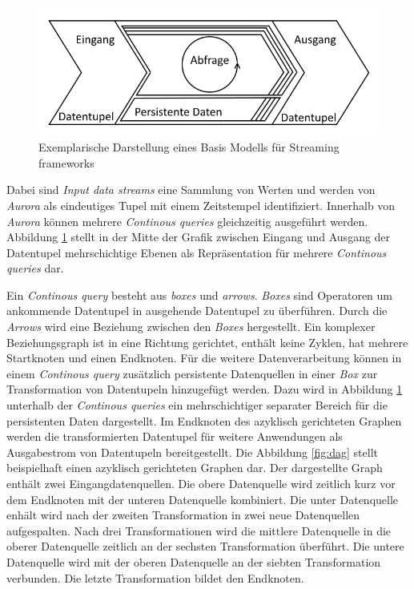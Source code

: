 \begin{figure}[htb!]
\centering
\includegraphics[width=1.0\textwidth]{bilder/StreamingFrameworkBasisModell.png}
\caption{Exemplarische Darstellung eines Basis Modells für Streaming frameworks
\label{fig:basismodell}}
\end{figure}

Dabei sind \textit{Input data streams} eine Sammlung von Werten und werden von \textit{Aurora} als eindeutiges Tupel mit einem Zeitstempel identifiziert. Innerhalb von \textit{Aurora} können mehrere \textit{Continous queries} gleichzeitig ausgeführt werden. Abbildung \ref{fig:basismodell} stellt in der Mitte der Grafik zwischen Eingang und Ausgang der Datentupel mehrschichtige Ebenen als Repräsentation für mehrere \textit{Continous queries} dar.

Ein \textit{Continous query} besteht aus \textit{boxes }und \textit{arrows}. \textit{Boxes} sind Operatoren um ankommende Datentupel in ausgehende Datentupel zu überführen. Durch die \textit{Arrows} wird eine Beziehung zwischen den \textit{Boxes} hergestellt. Ein komplexer Beziehungsgraph ist in eine Richtung gerichtet, enthält keine Zyklen, hat mehrere Startknoten und einen Endknoten. Für die weitere Datenverarbeitung können in einem \textit{Continous query} zusätzlich persistente Datenquellen in einer \textit{Box} zur Transformation von Datentupeln hinzugefügt werden. Dazu wird in Abbildung \ref{fig:basismodell} unterhalb der \textit{Continous queries} ein mehrschichtiger separater Bereich für die persistenten Daten dargestellt. Im Endknoten des azyklisch gerichteten Graphen werden die transformierten Datentupel für weitere Anwendungen als Ausgabestrom von Datentupeln bereitgestellt. Die Abbildung \ref{fig:dag} stellt beispielhaft einen azyklisch gerichteten Graphen dar. Der dargestellte Graph enthält zwei Eingangdatenquellen. Die obere Datenquelle wird zeitlich kurz vor dem Endknoten mit der unteren Datenquelle kombiniert. Die unter Datenquelle enhält wird nach der zweiten Transformation in zwei neue Datenquellen aufgespalten. Nach drei Transformationen wird die mittlere Datenquelle in die oberer Datenquelle zeitlich an der sechsten Transformation überführt. Die untere Datenquelle wird mit der oberen Datenquelle an der siebten Transformation verbunden. Die letzte Transformation bildet den Endknoten.


